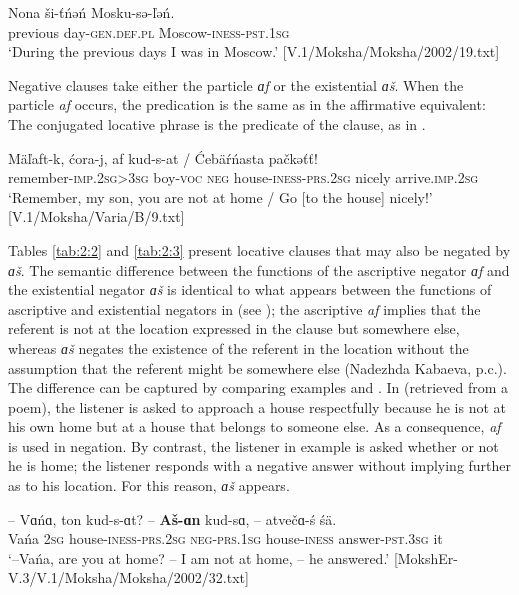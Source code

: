 \documentclass[output=paper]{langsci/langscibook}
\begin{document}
\ea\label{ex:moksha-Moscow}
\gll Nona ši-ťńəń Mosku-sə-ľəń.\\
previous day-\textsc{gen.def.pl} Moscow-\textsc{iness-pst.1sg}\\
\glt `During the previous days I was in Moscow.' [V.1/Moksha/Moksha/2002/19.txt]
\z

  Negative clauses take either the particle \textit{ɑf} or the existential \textit{ɑš}. When the particle \textit{af} occurs, the predication is the same as in the affirmative equivalent: The conjugated locative phrase is the predicate of the clause, as in .

\ea\label{ex:moksha-nicely}
\gll Mäľaft-k, ćora-j, af kud-s-at / \'Cebäŕńasta pačkəťť!\\
remember-\textsc{imp.2sg>3sg} boy-\textsc{voc} \textsc{neg} house-\textsc{iness-prs.2sg} {} nicely arrive.\textsc{imp.2sg}\\
\glt `Remember, my son, you are not at home / Go [to the house] nicely!' [V.1/Moksha/Varia/B/9.txt]
\z

  Tables \ref{tab:2:2} and \ref{tab:2:3} present locative clauses that may also be negated by \textit{ɑš}. The semantic difference between the functions of the ascriptive negator \textit{ɑf} and the existential negator \textit{ɑš} is identical to what appears between the functions of ascriptive and existential negators in  (see \citealt[91]{Hamari2007}); the ascriptive \textit{af} implies that the referent is not at the location expressed in the clause but somewhere else, whereas \textit{ɑš} negates the existence of the referent in the location without the assumption that the referent might be somewhere else (Nadezhda Kabaeva, p.c.). The difference can be captured by comparing examples  and . In  (retrieved from a poem), the listener is asked to approach a house respectfully because he is not at his own home but at a house that belongs to someone else. As a consequence, \textit{af} is used in negation. By contrast, the listener in example  is asked whether or not he is home; the listener responds with a negative answer without implying further as to his location. For this reason, \textit{ɑš} appears.

\ea\label{ex:moksha-Vanja}
\gll -- Vɑńɑ, ton kud-s-ɑt? -- \textbf{Aš-ɑn} kud-sɑ, -- atvečɑ-ś śä.\\
{} Vańa \textsc{2sg} house-\textsc{iness-prs.2sg} {} \textsc{neg-prs.1sg} house-\textsc{iness} {} answer-\textsc{pst.3sg} it\\
\glt `--Vańa, are you at home? -- I am not at home, -- he answered.' [MokshEr-V.3/V.1/Moksha/Moksha/2002/32.txt]
\z
\end{document}
